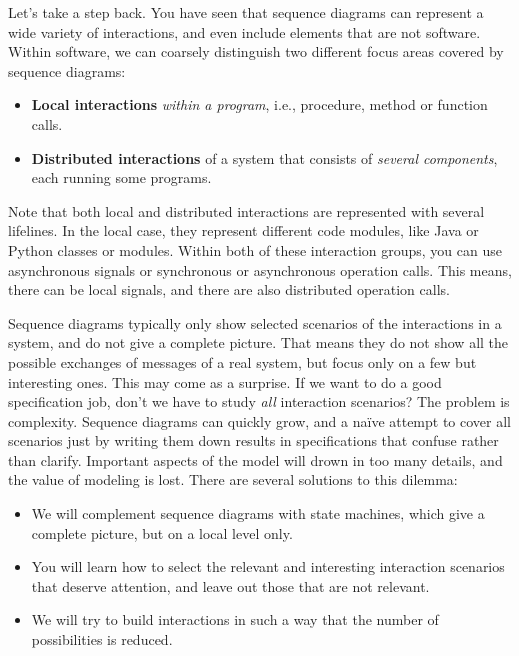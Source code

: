 \documentclass[10pt, twoside, twocolumn]{book}
\begin{document}
Let's take a step back. You have seen that sequence diagrams can
represent a wide variety of interactions, and even include elements that
are not software. Within software, we can coarsely distinguish two
different focus areas covered by sequence diagrams:

\begin{itemize}
\item
  \textbf{Local interactions} \emph{within a program}, i.e., procedure,
  method or function calls.
\item
  \textbf{Distributed interactions} of a system that consists of
  \emph{several components}, each running some programs.
\end{itemize}

Note that both local and distributed interactions are represented with
several lifelines. In the local case, they represent different code
modules, like Java or Python classes or modules. Within both of these
interaction groups, you can use asynchronous signals or synchronous or
asynchronous operation calls. This means, there can be local signals,
and there are also distributed operation calls.

Sequence diagrams typically only show selected scenarios of the
interactions in a system, and do not give a complete picture. That means
they do not show all the possible exchanges of messages of a real
system, but focus only on a few but interesting ones. This may come as a
surprise. If we want to do a good specification job, don't we have to
study \emph{all} interaction scenarios? The problem is complexity.
Sequence diagrams can quickly grow, and a naïve attempt to cover all
scenarios just by writing them down results in specifications that
confuse rather than clarify. Important aspects of the model will drown
in too many details, and the value of modeling is lost. There are
several solutions to this dilemma:

\begin{itemize}
\item
  We will complement sequence diagrams with state machines, which give a
  complete picture, but on a local level only.
\item
  You will learn how to select the relevant and interesting interaction
  scenarios that deserve attention, and leave out those that are not
  relevant.
\item
  We will try to build interactions in such a way that the number of
  possibilities is reduced.
\end{itemize}
\end{document}
